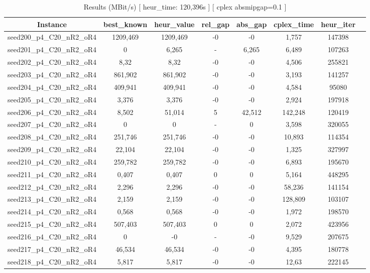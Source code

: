 \documentclass[a4paper]{article}
\begin{document}
\begin{center}
\begin{longtable}{cccccccc}
\caption{Results (MBit/s) [ heur\_time: 120,396s ]  [ cplex absmipgap=0.1 ]}
\tabularnewline
\hline
Instance & best\_known & heur\_value & rel\_gap & abs\_gap & cplex\_time & heur\_iter\\
\hline
seed200\_p4\_C20\_nR2\_oR4 & 1209,469 & 1209,469 & -0 & -0 & 1,757 & 147398\\
\hline
seed201\_p4\_C20\_nR2\_oR4 & 0 & 6,265 & - & 6,265 & 6,489 & 107263\\
\hline
seed202\_p4\_C20\_nR2\_oR4 & 8,32 & 8,32 & -0 & -0 & 4,506 & 255821\\
\hline
seed203\_p4\_C20\_nR2\_oR4 & 861,902 & 861,902 & -0 & -0 & 3,193 & 141257\\
\hline
seed204\_p4\_C20\_nR2\_oR4 & 409,941 & 409,941 & -0 & -0 & 4,584 & 95080\\
\hline
seed205\_p4\_C20\_nR2\_oR4 & 3,376 & 3,376 & -0 & -0 & 2,924 & 197918\\
\hline
seed206\_p4\_C20\_nR2\_oR4 & 8,502 & 51,014 & 5 & 42,512 & 142,248 & 120419\\
\hline
seed207\_p4\_C20\_nR2\_oR4 & 0 & 0 & - & 0 & 3,598 & 320055\\
\hline
seed208\_p4\_C20\_nR2\_oR4 & 251,746 & 251,746 & -0 & -0 & 10,893 & 114354\\
\hline
seed209\_p4\_C20\_nR2\_oR4 & 22,104 & 22,104 & -0 & -0 & 1,325 & 327997\\
\hline
seed210\_p4\_C20\_nR2\_oR4 & 259,782 & 259,782 & -0 & -0 & 6,893 & 195670\\
\hline
seed211\_p4\_C20\_nR2\_oR4 & 0,407 & 0,407 & 0 & 0 & 5,164 & 448295\\
\hline
seed212\_p4\_C20\_nR2\_oR4 & 2,296 & 2,296 & -0 & -0 & 58,236 & 141154\\
\hline
seed213\_p4\_C20\_nR2\_oR4 & 2,159 & 2,159 & -0 & -0 & 128,809 & 103107\\
\hline
seed214\_p4\_C20\_nR2\_oR4 & 0,568 & 0,568 & -0 & -0 & 1,972 & 198570\\
\hline
seed215\_p4\_C20\_nR2\_oR4 & 507,403 & 507,403 & 0 & 0 & 2,072 & 423956\\
\hline
seed216\_p4\_C20\_nR2\_oR4 & 0 & -0 & - & -0 & 9,529 & 207675\\
\hline
seed217\_p4\_C20\_nR2\_oR4 & 46,534 & 46,534 & -0 & -0 & 4,395 & 180778\\
\hline
seed218\_p4\_C20\_nR2\_oR4 & 5,817 & 5,817 & -0 & -0 & 12,63 & 222145\\

\end{longtable}
\end{center}
\end{document}
